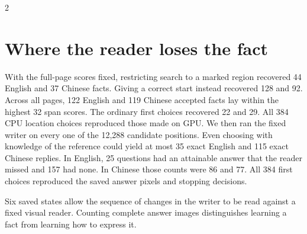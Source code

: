 \begin{multicols}{2}
\section*{Where the reader loses the fact}
With the full-page scores fixed, restricting search to a marked region recovered 44 English and 37 Chinese facts. Giving a correct start instead recovered 128 and 92. Across all pages, 122 English and 119 Chinese accepted facts lay within the highest 32 span scores. The ordinary first choices recovered 22 and 29. All 384 CPU location choices reproduced those made on GPU. We then ran the fixed writer on every one of the 12,288 candidate positions. Even choosing with knowledge of the reference could yield at most 35 exact English and 115 exact Chinese replies. In English, 25 questions had an attainable answer that the reader missed and 157 had none. In Chinese those counts were 86 and 77. All 384 first choices reproduced the saved answer pixels and stopping decisions.
\end{multicols}
\newpage
{}
\noindent Six saved states allow the sequence of changes in the writer to be read against a fixed visual reader. Counting complete answer images distinguishes learning a fact from learning how to express it.
